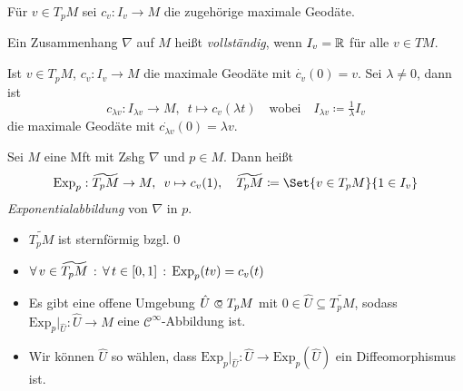 \documentclass{cheat-sheet}
\newcommand{\Exp}{\mathrm{Exp}} %
\begin{document}
\begin{nota}
  Für $v \in T_p M$ sei $c_v : I_v \to M$ die zugehörige maximale Geodäte.
\end{nota}

\begin{defn}
  Ein Zusammenhang $\nabla$ auf $M$ heißt \emph{vollständig}, wenn $I_v = \mathbb{R}$ für alle $v \in TM$.
\end{defn}


\begin{lem}
  Ist $v \in T_p M$, $c_v : I_v \to M$ die maximale Geodäte mit $\dot{c_v}(0) = v$.
  Sei $\lambda \not= 0$, dann ist
  \[
    c_{\lambda v} : I_{\lambda v} \to M, \enspace
    t \mapsto c_v(\lambda t) \quad \text{wobei} \quad
    I_{\lambda v} \coloneqq \tfrac{1}{\lambda} I_v
  \]
  die maximale Geodäte mit $\dot{c_{\lambda v}}(0) = \lambda v$.
\end{lem}


\begin{defn}
  Sei $M$ eine Mft mit Zshg $\nabla$ und $p \in M$. Dann heißt
  \[
    \Exp_p : \widetilde{T_p M} \to M, \enspace
    v \mapsto c_v(1), \quad
    \widetilde{T_p M} \coloneqq \Set{ v \in T_p M }{ 1 \in I_v }
  \]
  \emph{Exponentialabbildung} von $\nabla$ in $p$.
\end{defn}

\begin{lem}
  \begin{itemize}
    \item $\widetilde{T_p M}$ ist sternförmig bzgl. $0$
    \item $\fa{v \in \widetilde{T_p M}} \fa{t \in \cinterval{0}{1}} \Exp_p(tv) = c_v(t)$
  \end{itemize}
\end{lem}

\begin{satz}
  \begin{itemize}
    \item Es gibt eine offene Umgebung $\hat{U} \opn T_p M$ mit $0 \in \hat{U} \subseteq \widetilde{T_p M}$, sodass $\Exp_p|_{\hat{U}} : \hat{U} \to M$ eine $\mathcal{C}^\infty$-Abbildung ist.
    \item Wir können $\hat{U}$ so wählen, dass $\Exp_p|_{\hat{U}} : \hat{U} \to \Exp_p(\hat{U})$ ein Diffeomorphismus ist.
  \end{itemize}
\end{satz}
\end{document}
